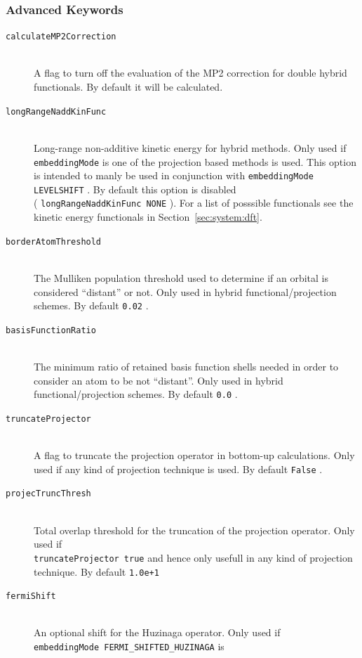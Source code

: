 \documentclass[bibliography=totocnumbered,a4paper,10pt,oneside]{scrbook}
\newcommand{\ttt}[1]{%
  \begingroup\setlength{\fboxsep}{1pt}%
  \colorbox{serenity-green!30}{\texttt{\hspace*{2pt}\vphantom{(g}#1\hspace*{2pt}}}%
  \endgroup
}
\begin{document}
\subsubsection{Advanced Keywords}
\begin{description}
  \item [\texttt{calculateMP2Correction}]\hfill \\
    A flag to turn off the evaluation of the MP2 correction for double hybrid functionals. By default it will
    be calculated.
  \item [\texttt{longRangeNaddKinFunc}]\hfill \\
    Long-range non-additive kinetic energy for hybrid methods. Only used if \ttt{embeddingMode} is one of
    the projection based methods is used. This option is intended to manly be used in conjunction with
    \ttt{embeddingMode LEVELSHIFT}. By default this option is disabled\\ (\ttt{longRangeNaddKinFunc NONE}).
    For a list of posssible functionals see the kinetic energy functionals in Section~\ref{sec:system:dft}.
  \item [\texttt{borderAtomThreshold}]\hfill \\
    The Mulliken population threshold used to determine if an orbital is considered ``distant'' or not.
    Only used in hybrid functional/projection schemes. By default \ttt{0.02}.
  \item [\texttt{basisFunctionRatio}]\hfill \\
    The minimum ratio of retained basis function shells needed in order to consider an atom to be not
    ``distant''. Only used in hybrid functional/projection schemes. By default \ttt{0.0}.
  \item [\texttt{truncateProjector}]\hfill \\
    A flag to truncate the projection operator in bottom-up calculations. Only used if any kind of projection
    technique is used. By default \ttt{False}.
  \item [\texttt{projecTruncThresh}]\hfill \\
    Total overlap threshold for the truncation of the projection operator. Only used if \\
    \ttt{truncateProjector true} and hence only usefull in any kind of projection technique.
    By default \ttt{1.0e+1}
  \item [\texttt{fermiShift}]\hfill \\
    An optional shift for the Huzinaga operator. Only used if\\ \ttt{embeddingMode FERMI\_SHIFTED\_HUZINAGA} is

\end{description}
\end{document}
